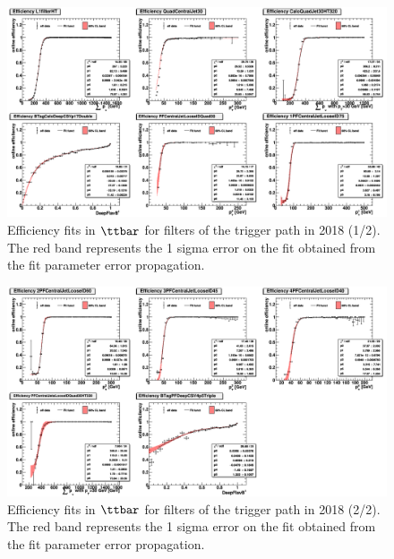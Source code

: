 \begin{figure}[htbp!]
\begin{center}
    \includegraphics[width=0.9\linewidth]{Figures/AnalysisStrategy/triggerfits/TriggerEfficiencies_2018_TTBarCut_TTbar_2018_1_Fit.png}
\end{center}
\caption[Efficiency fits in $\ttbar$ for filters of the trigger path in 2018 (1/2)]{Efficiency fits in $\ttbar$ for filters of the trigger path in 2018 (1/2). The red band represents the 1 sigma error on the fit obtained from the fit parameter error propagation.}
\label{trigger:fig:TTbarFilterEfficiency2018_1}
\end{figure}
    
\begin{figure}[htbp!]
\begin{center}
    \includegraphics[width=0.9\linewidth]{Figures/AnalysisStrategy/triggerfits/TriggerEfficiencies_2018_TTBarCut_TTbar_2018_2_Fit.png}
\end{center}
\caption[Efficiency fits in $\ttbar$ for filters of the trigger path in 2018 (2/2)]{Efficiency fits in $\ttbar$ for filters of the trigger path in 2018 (2/2). The red band represents the 1 sigma error on the fit obtained from the fit parameter error propagation.}
\label{trigger:fig:TTbarFilterEfficiency2018_2}
\end{figure}

